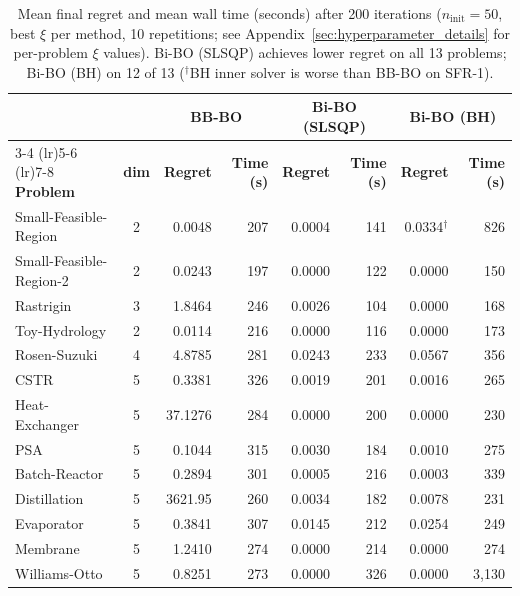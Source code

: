 \documentclass[12pt,a4paper]{article}%
\theoremstyle{plain}%
\theoremstyle{remark}%
\theoremstyle{definition}%
\providecommand{\DIFaddbegin}{} %
\providecommand{\DIFdelend}{} %
\newcommand{\DIFaddincludegraphics}[2][]{{\color{blue}\fbox{\DIFOincludegraphics[#1]{#2}}}} %
\DeclareRobustCommand{\DIFaddbegin}{\DIFOaddbegin \let\includegraphics\DIFaddincludegraphics} %
\DeclareRobustCommand{\DIFdelend}{\DIFOaddend \let\includegraphics\DIFOincludegraphics} %
\begin{document}
\DIFdelend \DIFaddbegin \begin{table}[htbp]
\centering
\small
\caption{Mean final regret and mean wall time (seconds) after 200 iterations ($n_\text{init}=50$, best $\xi$ per method, 10 repetitions; see Appendix~\ref{sec:hyperparameter_details} for per-problem $\xi$ values). Bi-BO (SLSQP) achieves lower regret on all 13 problems; Bi-BO (BH) on 12 of 13 ($^\dagger$BH inner solver is worse than BB-BO on SFR-1).}
\label{tab:final_regret}
\begin{tabular}{@{}lc rr rr rr@{}}
\toprule
 & & \multicolumn{2}{c}{\textbf{BB-BO}} & \multicolumn{2}{c}{\textbf{Bi-BO (SLSQP)}} & \multicolumn{2}{c}{\textbf{Bi-BO (BH)}} \\
\cmidrule(lr){3-4} \cmidrule(lr){5-6} \cmidrule(lr){7-8}
\textbf{Problem} & \textbf{dim} & \textbf{Regret} & \textbf{Time (s)} & \textbf{Regret} & \textbf{Time (s)} & \textbf{Regret} & \textbf{Time (s)} \\
\midrule
Small-Feasible-Region   & 2 & 0.0048  & 207  & 0.0004 & 141 & 0.0334$^\dagger$ & 826   \\
Small-Feasible-Region-2 & 2 & 0.0243  & 197  & 0.0000 & 122 & 0.0000           & 150   \\
Rastrigin               & 3 & 1.8464  & 246  & 0.0026 & 104 & 0.0000           & 168   \\
Toy-Hydrology           & 2 & 0.0114  & 216  & 0.0000 & 116 & 0.0000           & 173   \\
Rosen-Suzuki            & 4 & 4.8785  & 281  & 0.0243 & 233 & 0.0567           & 356   \\
\midrule
CSTR                    & 5 & 0.3381  & 326  & 0.0019 & 201 & 0.0016           & 265   \\
Heat-Exchanger          & 5 & 37.1276 & 284  & 0.0000 & 200 & 0.0000           & 230   \\
PSA                     & 5 & 0.1044  & 315  & 0.0030 & 184 & 0.0010           & 275   \\
Batch-Reactor           & 5 & 0.2894  & 301  & 0.0005 & 216 & 0.0003           & 339   \\
Distillation            & 5 & 3621.95 & 260  & 0.0034 & 182 & 0.0078           & 231   \\
Evaporator              & 5 & 0.3841  & 307  & 0.0145 & 212 & 0.0254           & 249   \\
Membrane                & 5 & 1.2410  & 274  & 0.0000 & 214 & 0.0000           & 274   \\
Williams-Otto           & 5 & 0.8251  & 273  & 0.0000 & 326 & 0.0000           & 3{,}130 \\
\bottomrule
\end{tabular}
\end{table}
\end{document}

